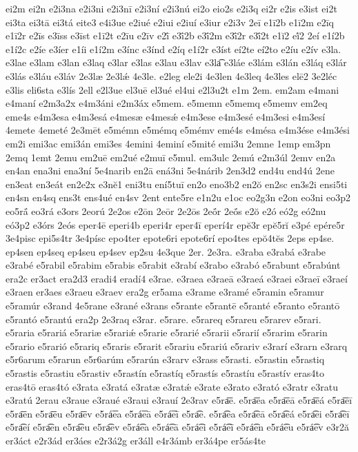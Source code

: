 {ei2m
ei2n
e2i3na
e2i3ni
e2i3nī
e2i3ní
e2i3nú
ei2o
eio2s
e2i3q
ei2r
e2is
e3ist
ei2t
ei3ta
ei3tā
ei3tá
eite3
e4i3ue
e2iué
e2iui
e2iuí
e3iur
e2i3v
2eī
e1ī2b
e1ī2m
e2īq
e1ī2r
e2īs
e3īss
e3īst
e1ī2t
e2īu
e2īv
e2ī́
e3ī́2b
e3ī́2m
e3ī́2r
e3ī́2t
e1ĭ2
eĭ́2
2eí
e1í2b
e1í2c
e2íe
e3íer
e1íi
e1í2m
e3ínc
e3índ
e2íq
e1í2r
e3íst
eí2te
eí2to
e2íu
e2ív
e3la.
e3lae
e3lam
e3lan
e3laq
e3lar
e3las
e3lau
e3lav
e3la͡
e3láe
e3lám
e3lán
e3láq
e3lár
e3lás
e3láu
e3láv
2e3læ
2e3lǽ
4e3le.
e2leg
ele2i
4e3len
4e3leq
4e3les
elē2
3e2léc
e3lis
eli6sta
e3lís
2ell
e2l3ue
el3uē
el3ué
el4ui
e2l3u2t
e1m
2em.
em2am
e4mani
e4maní
e2m3a2x
e4m3áni
e2m3áx
e5mem.
e5memn
e5memq
e5memv
em2eq
eme4s
e4m3esa
e4m3esá
e4mesæ
e4mesǽ
e4m3ese
e4m3esé
e4m3esi
e4m3esí
4emete
4emeté
2e3mēt
e5mémn
e5mémq
e5mémv
emé4s
e4mésa
e4m3ése
e4m3ési
em2i
emi3ac
emi3án
emi3es
4emini
4eminí
e5mité
emi3u
2emne
1emp
em3pn
2emq
1emt
2emu
em2uē
em2ué
e2muī
e5mul.
em3ulc
2emú
e2m3úl
2emv
en2a
en4an
ena3ni
ena3ní
5e4narib
en2ā
ená3ni
5e4nárib
2en3d2
end4u
end4ú
2ene
en3eat
en3eát
en2e2x
e3nĕ1
eni3tu
ení5tuī
en2o
eno3b2
en2ŏ
en2sc
en3s2i
ensi5ti
en4sn
en4sq
ens3t
ens4ué
en4sv
2ent
ente5re
e1n2u
e1oc
eo2g3n
e2on
eo3ni
eo3p2
eo5rā́
eo3rá
e3ors
2eorú
2e2os
e2ōn
2eōr
2e2ōs
2eṓr
2eṓs
e2ŏ
e2ó
eó2g
eó2nu
eó3p2
e3órs
2eós
eper4ē
eperi4b
eperi4r
eper4ī
eperí4r
epĕ3r
epĕ5rĭ
e3pé
epére5r
3e4pisc
epi5s4tr
3e4písc
epo4ter
epote6ri
epote6rí
epo4tes
epŏ4tĕs
2eps
ep4se.
ep4sen
ep4seq
ep4seu
ep4sev
ep2su
4e3que
2er.
2e3ra.
e3raba
e3rabá
e3rabe
e3rabé
e5rabil
e5rabim
e5rabis
e5rabit
e3rabí
e3rabo
e3rabó
e5rabunt
e5rabúnt
era2c
er3act
era2d3
eradi4
eradí4
e3rae.
e3raea
e3raeā
e3raeá
e3raei
e3raeī
e3raeí
e3raen
er3aes
e3raeu
e3raev
era2g
er5ama
e3rame
e3ramé
e5ramin
e5ramur
e5ramúr
e3rand
4e5rane
e3rané
e3rans
e5rante
e5rantē
e5ranté
e5ranto
e5rantō
e5rantó
e5rantú
era2p
2e3raq
e3rar.
e5rare.
e5rareq
e5rareu
e5rarev
e5rari.
e5raria
e5rariá
e5rariæ
e5rariǽ
e5rarie
e5rarié
e5rarii
e5rarií
e5rarim
e5rarin
e5rario
e5rarió
e5rariq
e5raris
e5rarit
e5rariu
e5rariú
e5rariv
e3rarí
e3rarn
e3rarq
e5r6arum
e5rarun
e5r6arúm
e5rarún
e3rarv
e3rass
e5rasti.
e5rastin
e5rastiq
e5rastis
e5rastiu
e5rastiv
e5rastín
e5rastíq
e5rastís
e5rastíu
e5rastív
eras4to
eras4tō
eras4tó
e3rata
e3ratá
e3ratæ
e3ratǽ
e3rate
e3rato
e3rató
e3ratr
e3ratu
e3ratú
2erau
e3raue
e3raué
e3raui
e3rauí
2e3rav
e5ra͞e.
e5ra͞ea
e5ra͞eā
e5ra͞eá
e5ra͞eī
e5ra͞en
e5ra͞eu
e5ra͞ev
e5rá͞ea
e5rá͞eā
e5rá͞eī
e5ra͡e.
e5ra͡ea
e5ra͡eā
e5ra͡eá
e5ra͡ei
e5ra͡eī
e5ra͡eí
e5ra͡en
e5ra͡eu
e5ra͡ev
e5rá͡ea
e5rá͡eā
e5rá͡ei
e5rá͡eī
e5rá͡en
e5rá͡eu
e5rá͡ev
e3r2ă
er3áct
e2r3ád
er3áes
e2r3á2g
er3áll
e4r3ámb
er3á4pe
er5ás4te
}
